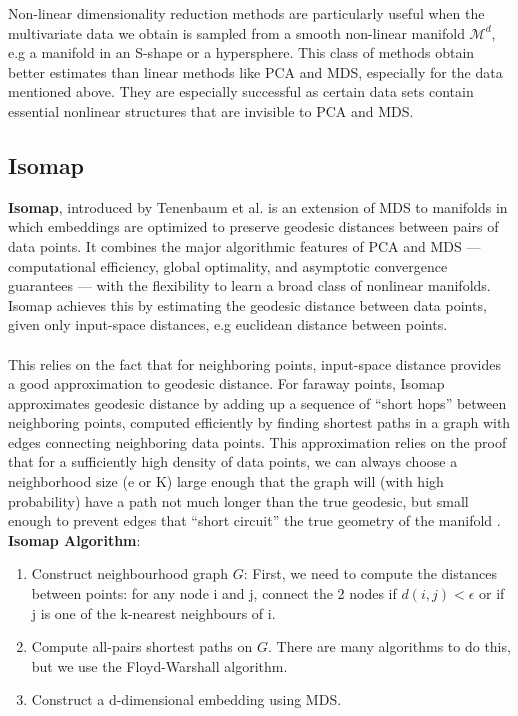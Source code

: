 \documentclass[12pt]{report}
\begin{document}
Non-linear dimensionality reduction methods are particularly useful 
when the multivariate data we obtain is sampled 
from a smooth non-linear manifold $\mathcal{M}^d$, 
e.g a manifold in an S-shape or a hypersphere. 
This class of methods obtain better estimates than linear methods like PCA and MDS,
especially for the data mentioned above. 
They are especially successful as certain data sets contain 
essential nonlinear structures that are invisible to PCA and MDS.

\newpage

\subsection{Isomap}

\textbf{Isomap}, introduced by Tenenbaum et al. \cite{isomap} is an extension 
of MDS to manifolds in which embeddings 
are optimized to preserve geodesic distances between pairs of data points.
It combines the major algorithmic features of PCA and MDS
 — computational efficiency, global optimality, 
 and asymptotic convergence guarantees — 
 with the flexibility to learn a broad class of nonlinear manifolds.
 Isomap achieves this by estimating the geodesic distance between data points, 
 given only input-space distances, e.g euclidean distance between points.\\
\\
This relies on the fact that for neighboring points, 
input-space distance provides a good approximation to geodesic distance. 
For faraway points, Isomap approximates geodesic distance 
by adding up a sequence of “short hops” between neighboring points, 
computed efficiently by finding shortest paths in a graph with edges 
connecting neighboring data points.  
This approximation relies on the proof that for a 
sufficiently high density of data points, 
we can always choose a neighborhood size (e or K) large enough 
that the graph will (with high probability) have a path not much longer 
than the true geodesic, but small enough to prevent edges 
that “short circuit” the true geometry of the manifold \cite{isomap}.\\
\textbf{Isomap Algorithm}:
\begin{enumerate}
    \item Construct neighbourhood graph $G$: 
    First, we need to compute the distances between points: 
    for any node i and j, connect the 2 nodes if 
    $d(i,j) < \epsilon$ or if j is one of the k-nearest neighbours of i.
    \item Compute all-pairs shortest paths on $G$. 
    There are many algorithms to do this, but we use the Floyd-Warshall algorithm.
    \item Construct a d-dimensional embedding using MDS.
\end{enumerate}
\end{document}
